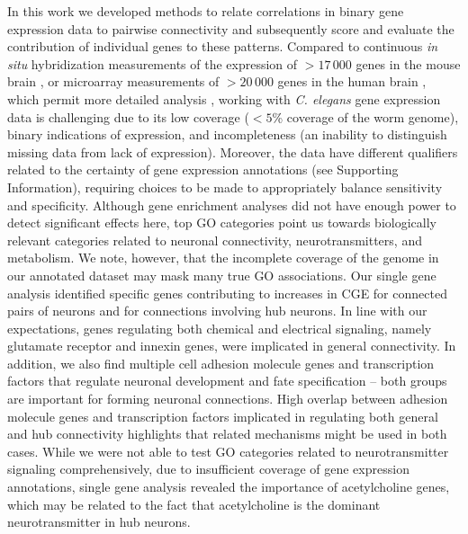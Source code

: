 \documentclass[10pt,letterpaper]{article}
\begin{document}
{%
In this work we developed methods to relate correlations in binary gene expression data to pairwise connectivity and subsequently score and evaluate the contribution of individual genes to these patterns.
Compared to continuous \emph{in situ} hybridization measurements of the expression of $>17\,000$ genes in the mouse brain \cite{Lein:2007jn}, or microarray measurements of $>20\,000$ genes in the human brain \cite{Hawrylycz:2012ky, Shen:2012ua}, which permit more detailed analysis \cite{Fulcher:2016ck, Ji:2014jw, Fakhry:2015kl, French2011, Vertes2016a, Parkes:2017dn}, working with \emph{C. elegans} gene expression data is challenging due to its low coverage ($<5$\% coverage of the worm genome), binary indications of expression, and incompleteness (an inability to distinguish missing data from lack of expression).
Moreover, the data have different qualifiers related to the certainty of gene expression annotations (see Supporting Information), requiring choices to be made to appropriately balance sensitivity and specificity.
Although gene enrichment analyses did not have enough power to detect significant effects here, top GO categories point us towards biologically relevant categories related to neuronal connectivity, neurotransmitters, and metabolism.
We note, however, that the incomplete coverage of the genome in our annotated dataset may mask many true GO associations.
Our single gene analysis identified specific genes contributing to increases in CGE for connected pairs of neurons and for connections involving hub neurons.
In line with our expectations, genes regulating both chemical and electrical signaling, namely glutamate receptor and innexin genes, were implicated in general connectivity.
In addition, we also find multiple cell adhesion molecule genes and transcription factors that regulate neuronal development and fate specification -- both groups are important for forming neuronal connections.
High overlap between adhesion molecule genes and transcription factors implicated in regulating both general and hub connectivity highlights that related mechanisms might be used in both cases.
While we were not able to test GO categories related to neurotransmitter signaling comprehensively, due to insufficient coverage of gene expression annotations, single gene analysis revealed the importance of acetylcholine genes, which may be related to the fact that acetylcholine is the dominant neurotransmitter in hub neurons.
}
\end{document}
